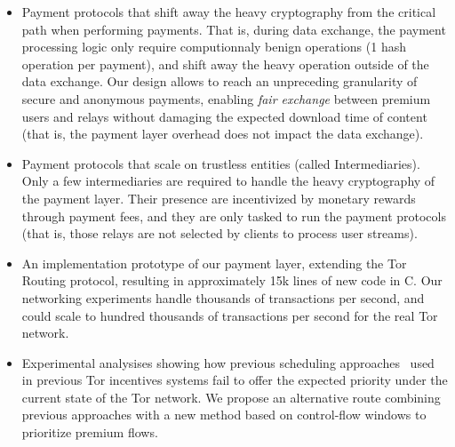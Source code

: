  \begin{itemize}
 	\item Payment protocols that shift away the heavy cryptography from the
          critical path when performing payments. That is, during data exchange,
          the payment processing logic only require computionnaly benign
          operations (1 hash operation per payment), and shift away the heavy
          operation outside of the data exchange. Our design allows to reach an
          unpreceding granularity of secure and anonymous payments, enabling
          \textit{fair exchange} between premium users and relays without
          damaging the expected download time of content (that is, the payment
          layer overhead does not impact the data exchange).
 	\item Payment protocols that scale on trustless entities (called
          Intermediaries). Only a few intermediaries are required to handle the
          heavy cryptography of the payment layer. Their presence are
          incentivized by monetary rewards through payment fees, and they are
          only tasked to run the payment protocols (that is, those relays are
          not selected by clients to process user streams).
 	
 	\item An implementation prototype of our payment layer, extending the
          Tor Routing protocol, resulting in approximately 15k lines of new code
          in C. Our networking experiments handle thousands of transactions per
          second, and could scale to hundred thousands of transactions per
          second for the real Tor network.
 	
 	\item Experimental analysises showing how previous scheduling
          approaches~\cite{dovrolis1999case, tang2010improved} used in previous
          Tor incentives systems fail to offer the expected priority under the
          current state of the Tor network. We propose an alternative route
          combining previous approaches with a new method based on control-flow
          windows to prioritize premium flows.
 \end{itemize}
 

